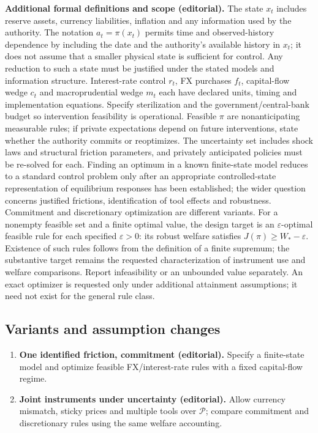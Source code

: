 \documentclass[11pt,a4paper]{article}
\begin{document}
\textbf{Additional formal definitions and scope (editorial).} The state \(x_t\) includes reserve assets, currency liabilities, inflation and any information used by the authority. The notation \(a_t=\pi(x_t)\) permits time and observed-history dependence by including the date and the authority's available history in \(x_t\); it does not assume that a smaller physical state is sufficient for control. Any reduction to such a state must be justified under the stated models and information structure. Interest-rate control \(r_t\), FX purchases \(f_t\), capital-flow wedge \(c_t\) and macroprudential wedge \(m_t\) each have declared units, timing and implementation equations. Specify sterilization and the government/central-bank budget so intervention feasibility is operational. Feasible \(\pi\) are nonanticipating measurable rules; if private expectations depend on future interventions, state whether the authority commits or reoptimizes. The uncertainty set includes shock laws and structural friction parameters, and privately anticipated policies must be re-solved for each. Finding an optimum in a known finite-state model reduces to a standard control problem only after an appropriate controlled-state representation of equilibrium responses has been established; the wider question concerns justified frictions, identification of tool effects and robustness. Commitment and discretionary optimization are different variants. For a nonempty feasible set and a finite optimal value, the design target is an \(\varepsilon\)-optimal feasible rule for each specified \(\varepsilon>0\): its robust welfare satisfies \(J(\pi)\geq W_*-\varepsilon\). Existence of such rules follows from the definition of a finite supremum; the substantive target remains the requested characterization of instrument use and welfare comparisons. Report infeasibility or an unbounded value separately. An exact optimizer is requested only under additional attainment assumptions; it need not exist for the general rule class.
\subsection*{Variants and assumption changes}
\begin{enumerate}
\item \textbf{One identified friction, commitment (editorial).} Specify a finite-state model and optimize feasible FX/interest-rate rules with a fixed capital-flow regime.
\item \textbf{Joint instruments under uncertainty (editorial).} Allow currency mismatch, sticky prices and multiple tools over \(\mathcal P\); compare commitment and discretionary rules using the same welfare accounting.
\end{enumerate}
\end{document}
